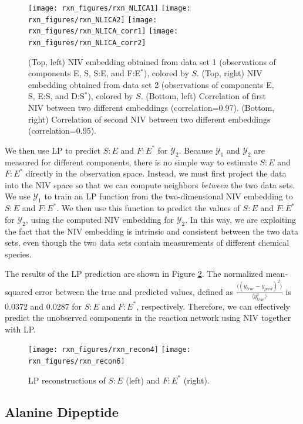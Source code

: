 \documentclass[aip,jcp,preprint]{revtex4-1}
\begin{document}
\begin{figure}[ht]
    \texttt{[image: rxn\_figures/rxn\_NLICA1]}
    \texttt{[image: rxn\_figures/rxn\_NLICA2]}
    \texttt{[image: rxn\_figures/rxn\_NLICA\_corr1]}
    \texttt{[image: rxn\_figures/rxn\_NLICA\_corr2]}
    \caption{(Top, left) NIV embedding obtained from data set 1 (observations of components E, S, S:E, and F:E$^{*}$), colored by $S$. (Top, right) NIV embedding obtained from data set 2 (observations of components E, S, E:S, and D:S$^{*}$), colored by $S$. (Bottom, left) Correlation of first NIV between two different embeddings (correlation=0.97). (Bottom, right)  Correlation of second NIV between two different embeddings (correlation=0.95).}
    \label{fig:rxn_embedding}
\end{figure}

We then use LP to predict $S:E$ and $F:E^{*}$ for $\mathcal{Y}_2$.
%
Because $\mathcal{Y}_1$ and $\mathcal{Y}_2$ are measured for different components, there is no simple way to estimate $S:E$ and $F:E^{*}$ directly in the observation space.
%
Instead, we must first project the data into the NIV space so that we can compute neighbors {\em between} the two data sets.
%
We use $\mathcal{Y}_1$ to train an LP function from the two-dimensional NIV embedding to $S:E$ and $F:E^{*}$.
%
We then use this function to predict the values  of $S:E$ and $F:E^{*}$ for $\mathcal{Y}_2$, using the computed NIV embedding for $\mathcal{Y}_2$.
%
In this way, we are exploiting the fact that the NIV embedding is intrinsic and consistent between the two data sets, even though the two data sets contain measurements of different chemical species.

The results of the LP prediction are shown in Figure \ref{fig:rxn_recon}.
%
The normalized mean-squared error between the true and predicted values, defined as $\frac{\langle (y_{true}-y_{pred})^2 \rangle}{\langle y_{true}^2 \rangle}$ is 0.0372 and 0.0287 for $S:E$ and $F:E^{*}$, respectively.
%
Therefore, we can effectively predict the unobserved components in the reaction network using NIV together with LP.

\begin{figure}[ht]
    \texttt{[image: rxn\_figures/rxn\_recon4]}
    \texttt{[image: rxn\_figures/rxn\_recon6]}
    \caption{LP reconstructions of $S:E$ (left) and $F:E^{*}$ (right).}
    \label{fig:rxn_recon}
\end{figure}

\subsection{Alanine Dipeptide}
\end{document}
